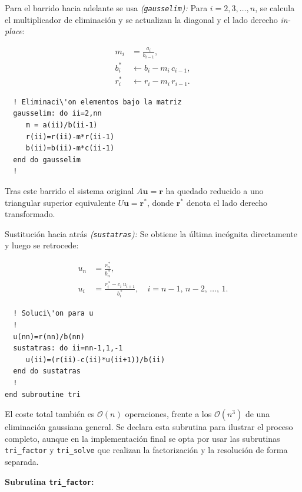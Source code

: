 \documentclass[11pt,a4paper]{article}
\begin{document}
Para el barrido hacia adelante se usa \textit{(\texttt{gausselim}):}
Para $i = 2, 3, \ldots, n$, se calcula el multiplicador de eliminaci\'on y
se actualizan la diagonal y el lado derecho \textit{in-place}:

\begin{align}
m_{i}          &= \frac{a_{i}}{b_{i-1}}, \\
b_{i}^{*}          &\leftarrow b_{i} - m_{i}\, c_{i-1}, \\
r_{i}^{*}          &\leftarrow r_{i} - m_{i}\, r_{i-1}.
\end{align}

\begin{verbatim}
  ! Eliminaci\'on elementos bajo la matriz
  gausselim: do ii=2,nn
     m = a(ii)/b(ii-1)
     r(ii)=r(ii)-m*r(ii-1)
     b(ii)=b(ii)-m*c(ii-1)
  end do gausselim
  !
\end{verbatim}

Tras este barrido el sistema original $A\mathbf{u}=\mathbf{r}$ ha quedado
reducido a uno triangular superior equivalente $U\mathbf{u}=\mathbf{r}^*$,
donde $\mathbf{r}^*$ denota el lado derecho transformado.

\medskip

Sustituci\'on hacia atr\'as \textit{(\texttt{sustatras}):}
Se obtiene la \'ultima inc\'ognita directamente y luego se retrocede:

\begin{align}
u_{n} &= \frac{r_{n}^{\,*}}{b_{n}^{\,*}}, \\[4pt]
u_{i} &= \frac{r_{i}^{\,*} - c_{i}\, u_{i+1}}{b_{i}^{\,*}},
\quad i = n-1,\, n-2,\, \ldots,\, 1.
\end{align}

\begin{verbatim}
  ! Soluci\'on para u
  !
  u(nn)=r(nn)/b(nn)
  sustatras: do ii=nn-1,1,-1
     u(ii)=(r(ii)-c(ii)*u(ii+1))/b(ii)
  end do sustatras
  !
end subroutine tri
\end{verbatim}

El coste total tambi\'en es $\mathcal{O}(n)$ operaciones, frente a los
$\mathcal{O}(n^3)$ de una eliminaci\'on gaussiana general. Se declara esta
subrutina para ilustrar el proceso completo, aunque en la implementaci\'on
final se opta por usar las subrutinas \verb|tri_factor| y \verb|tri_solve|
que realizan la factorizaci\'on y la resoluci\'on de forma separada.

\medskip

\textbf{Subrutina \texttt{tri\_factor}:}
\end{document}
